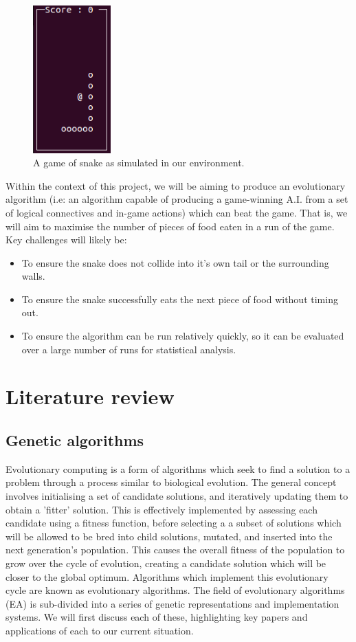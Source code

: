 \documentclass[british,10pt,a4paper]{article}
\begin{document}
\begin{minipage}{0.28\textwidth}
	\begin{figure}[H]
	\centering
		\includegraphics[width=3cm,keepaspectratio]{images/snake.png}
		\caption{A game of snake as simulated in our environment.}
		\label{fig:snake}
	\end{figure}
\end{minipage}
Within the context of this project, we will be aiming to produce an evolutionary algorithm (i.e: an algorithm capable of producing a game-winning A.I. from a set of logical connectives and in-game actions) which can beat the game. That is, we will aim to maximise the number of pieces of food eaten in a run of the game. Key challenges will likely be:
\begin{itemize}
	\item To ensure the snake does not collide into it's own tail or the surrounding walls.
	\item To ensure the snake successfully eats the next piece of food without timing out.
	\item To ensure the algorithm can be run relatively quickly, so it can be evaluated over a large number of runs for statistical analysis.
\end{itemize}

\section{Literature review}
\subsection{Genetic algorithms}
Evolutionary computing is a form of algorithms which seek to find a solution to a problem through a process similar to biological evolution. \cite{Ashlock_undated-vx} The general concept involves initialising a set of candidate solutions, and iteratively updating them to obtain a 'fitter' solution. This is effectively implemented by assessing each candidate using a fitness function, before selecting a a subset of solutions which will be allowed to be bred into child solutions, mutated, and inserted into the next generation's population. This causes the overall fitness of the population to grow over the cycle of evolution, creating a candidate solution which will be closer to the global optimum. Algorithms which implement this evolutionary cycle are known as evolutionary algorithms. The field of evolutionary algorithms (EA) is sub-divided into a series of genetic representations and implementation systems. We will first discuss each of these, highlighting key papers and applications of each to our current situation.\newline
\end{document}
